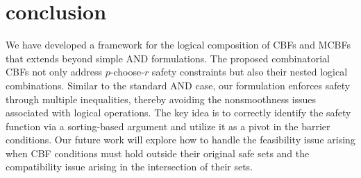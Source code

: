 \documentclass[journal,twoside,web]{ieeecolor}
\theoremstyle{definition}
\begin{document}
\section{conclusion}
We have developed a framework for the logical composition of CBFs and MCBFs that extends beyond simple AND formulations. The proposed combinatorial CBFs not only address $p$-choose-$r$ safety constraints but also their nested logical combinations. Similar to the standard AND case, our formulation enforces safety through multiple inequalities, thereby avoiding the nonsmoothness issues associated with logical operations. The key idea is to correctly identify the safety function via a sorting-based argument and utilize it as a pivot in the barrier conditions. Our future work will explore how to handle the feasibility issue arising when CBF conditions must hold outside their original safe sets and the compatibility issue arising in the intersection of their sets.





\end{document}
